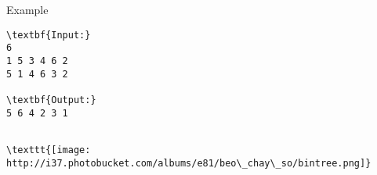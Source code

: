 Example
\begin{verbatim}
\textbf{Input:}
6
1 5 3 4 6 2
5 1 4 6 3 2

\textbf{Output:}
5 6 4 2 3 1\end{verbatim}
\begin{verbatim}

\texttt{[image: http://i37.photobucket.com/albums/e81/beo\_chay\_so/bintree.png]}\end{verbatim}